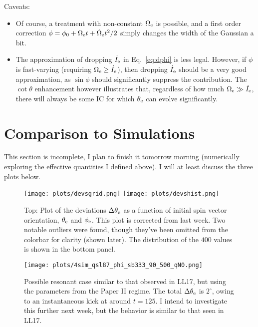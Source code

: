 \documentclass[11pt,
        usenames, %
        dvipsnames %
    ]{article}
\begin{document}
Caveats:
\begin{itemize}
    \item Of course, a treatment with non-constant $\Omega_{\rm e}$ is possible,
        and a first order correction $\phi = \phi_0 + \Omega_{\rm e}t +
        \dot{\Omega}_{\rm e}t^2/2$ simply changes the width of the Gaussian a
        bit.

    \item The approximation of dropping $\dot{I}_{\rm e}$ in Eq.~\eqref{eq:dphi}
        is less legal. However, if $\phi$ is fast-varying (requiring
        $\Omega_{\rm e} \geq \dot{I}_{\rm e}$), then dropping $\dot{I}_{\rm e}$
        should be a very good approximation, as $\sin \phi$ should significantly
        suppress the contribution. The $\cot \theta$ enhancement however
        illustrates that, regardless of how much $\Omega_{\rm e} \gg
        \dot{I}_{\rm e}$, there will always be some IC for which $\theta_{\rm
        e}$ can evolve significantly.
\end{itemize}

\section{Comparison to Simulations}

This section is incomplete, I plan to finish it tomorrow morning (numerically
exploring the effective quantities I defined above). I will at least discuss the
three plots below.
\begin{figure}
    \centering
    \texttt{[image: plots/devsgrid.png]}
    \texttt{[image: plots/devshist.png]}
    \caption{Top: Plot of the deviations $\Delta \theta_{\rm e}$ as a function
    of initial spin vector orientation, $\theta_{\rm e}$ and $\phi_{\rm e}$.
    This plot is corrected from last week. Two notable outliers were found,
    though they've been omitted from the colorbar for clarity (shown later). The
    distribution of the $400$ values is shown in the bottom
    panel.}\label{fig:devsgrid}
\end{figure}

\begin{figure}
    \centering
    \texttt{[image: plots/4sim\_qsl87\_phi\_sb333\_90\_500\_qN0.png]}
    \caption{Possible resonant case similar to that observed in LL17, but using
    the parameters from the Paper II regime. The total $\Delta \theta_{\rm e}$
    is $2^\circ$, owing to an instantaneous kick at around $t = 125$. I intend
    to investigate this further next week, but the behavior is similar to that
    seen in LL17.}\label{fig:kick}
\end{figure}
\end{document}
